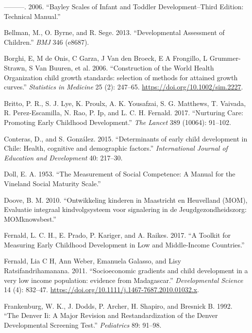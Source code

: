 \documentclass[
]{book}
\begin{document}
\leavevmode\hypertarget{ref-bayley2006}{}%
---------. 2006. ``Bayley Scales of Infant and Toddler Development--Third Edition: Technical Manual.''

\leavevmode\hypertarget{ref-bellman2013}{}%
Bellman, M., O. Byrne, and R. Sege. 2013. ``Developmental Assessment of Children.'' \emph{BMJ} 346 (e8687).

\leavevmode\hypertarget{ref-borghi2006}{}%
Borghi, E, M de Onis, C Garza, J Van den Broeck, E A Frongillo, L Grummer-Strawn, S Van Buuren, et al. 2006. ``Construction of the World Health Organization child growth standards: selection of methods for attained growth curves.'' \emph{Statistics in Medicine} 25 (2): 247--65. \url{https://doi.org/10.1002/sim.2227}.

\leavevmode\hypertarget{ref-britto2017}{}%
Britto, P. R., S. J. Lye, K. Proulx, A. K. Yousafzai, S. G. Matthews, T. Vaivada, R. Perez-Escamilla, N. Rao, P. Ip, and L. C. H. Fernald. 2017. ``Nurturing Care: Promoting Early Childhood Development.'' \emph{The Lancet} 389 (10064): 91--102.

\leavevmode\hypertarget{ref-conteras2015}{}%
Conteras, D., and S. González. 2015. ``Determinants of early child development in Chile: Health, cognitive and demographic factors.'' \emph{International Journal of Education and Development} 40: 217--30.

\leavevmode\hypertarget{ref-doll1953}{}%
Doll, E. A. 1953. ``The Measurement of Social Competence: A Manual for the Vineland Social Maturity Scale.''

\leavevmode\hypertarget{ref-doove2010}{}%
Doove, B. M. 2010. ``Ontwikkeling kinderen in Maastricht en Heuvelland (MOM), Evaluatie integraal kindvolgsysteem voor signalering in de Jeugdgezondheidszorg: MOMknowsbest.''

\leavevmode\hypertarget{ref-fernald2017toolkit}{}%
Fernald, L. C. H., E. Prado, P. Kariger, and A. Raikes. 2017. ``A Toolkit for Measuring Early Childhood Development in Low and Middle-Income Countries.''

\leavevmode\hypertarget{ref-Fernald2011}{}%
Fernald, Lia C H, Ann Weber, Emanuela Galasso, and Lisy Ratsifandrihamanana. 2011. ``Socioeconomic gradients and child development in a very low income population: evidence from Madagascar.'' \emph{Developmental Science} 14 (4): 832--47. \url{https://doi.org/10.1111/j.1467-7687.2010.01032.x}.

\leavevmode\hypertarget{ref-frankenburg1992}{}%
Frankenburg, W. K., J. Dodds, P. Archer, H. Shapiro, and Bresnick B. 1992. ``The Denver Ii: A Major Revision and Restandardization of the Denver Developmental Screening Test.'' \emph{Pediatrics} 89: 91--98.
\end{document}

